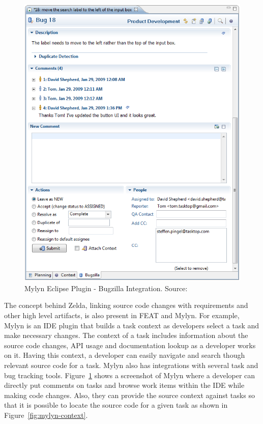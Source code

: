 \afterpage{\clearpage}
\begin{figure}[!htb]
	\centering
	\includegraphics[width=\textwidth]{Mylyn-comment.png}
    \caption{Mylyn Eclipse Plugin - Bugzilla Integration. Source: \cite{mylyn}}
	\label{fig:mylyn-comment}
\end{figure}

The concept behind Zelda, linking source code changes with requirements and other high level artifacts, is also present in FEAT\cite{feat} and Mylyn\cite{mylyn}. For example, Mylyn is an IDE plugin that builds a task context as developers select a task and make necessary changes. The context of a task includes information about the source code changes, API usage and documentation lookup as a developer works on it. Having this context, a developer can easily navigate and search though relevant source code for a task. Mylyn also has integrations with several task and bug tracking tools. Figure~\ref{fig:mylyn-comment} shows a screenshot of Mylyn where a developer can directly put comments on tasks and browse work items within the IDE while making code changes. Also, they can provide the source context against tasks so that it is possible to locate the source code for a given task as shown in Figure~\ref{fig:mylyn-context}.

